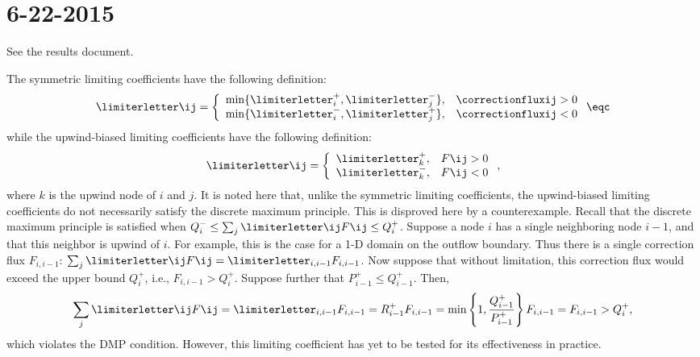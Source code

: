 \section*{6-22-2015}

\begin{enumerate}

See the results document.

The symmetric limiting coefficients have the following definition:
\begin{equation}
  \limiterletter\ij = \left\{\begin{array}{l l}
    \min\{\limiterletter_i^+,\limiterletter_j^-\}, & \correctionfluxij > 0 \\
    \min\{\limiterletter_i^-,\limiterletter_j^+\}, & \correctionfluxij < 0
  \end{array}\right.
  \eqc
\end{equation}
while the upwind-biased limiting coefficients have the following definition:
\begin{equation}
  \limiterletter\ij = \left\{\begin{array}{l l}
    \limiterletter_k^+, & F\ij > 0 \\
    \limiterletter_k^-, & F\ij < 0
  \end{array}\right.,
\end{equation}
where $k$ is the upwind node of $i$ and $j$. It is noted here that, unlike
the symmetric limiting coefficients, the upwind-biased limiting coefficients
do not necessarily satisfy the discrete maximum principle. This is disproved
here by a counterexample. Recall that the discrete maximum principle is satisfied when
$Q_i^-\le \sum_j \limiterletter\ij F\ij\le Q_i^+$. Suppose a node $i$ has a single
neighboring node $i-1$, and that this neighbor is upwind of $i$. For example, this is
the case for a 1-D domain on the outflow boundary. Thus there is a single
correction flux $F_{i,i-1}$: $\sum_j \limiterletter\ij F\ij=\limiterletter_{i,i-1} F_{i,i-1}$. Now
suppose that without limitation, this correction flux would exceed the
upper bound $Q_i^+$, i.e., $F_{i,i-1}>Q_i^+$. Suppose further that
$P_{i-1}^+\leq Q_{i-1}^+$. Then,
\[
  \sum\limits_j \limiterletter\ij F\ij=
  \limiterletter_{i,i-1} F_{i,i-1}=
  R_{i-1}^+ F_{i,i-1}=
  \min\left\{1,\frac{Q_{i-1}^+}{P_{i-1}^+}\right\} F_{i,i-1}=
  F_{i,i-1}>
  Q_i^+,
\]
which violates the DMP condition. However, this limiting coefficient has
yet to be tested for its effectiveness in practice.


\end{enumerate}
